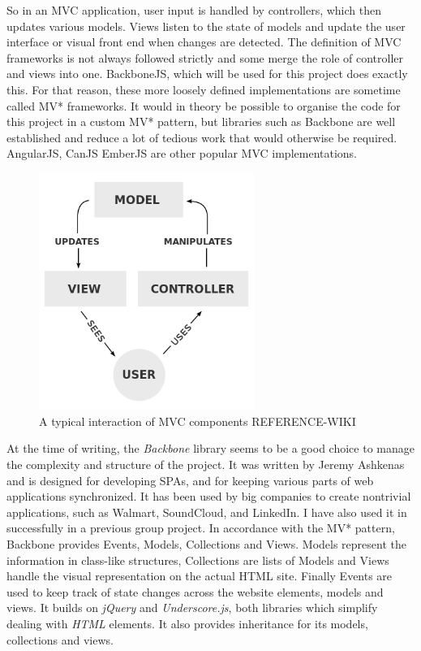\documentclass[a4paper,11pt,twoside]{article}
\begin{document}
So in an MVC application, user input is handled by controllers, which then updates various models. Views listen to the state of models and update the user interface or visual front end when changes are detected. The definition of MVC frameworks is not always followed strictly and some merge the role of controller and views into one. BackboneJS, which will be used for this project does exactly this. For that reason, these more loosely defined implementations are sometime called MV* frameworks. It would in theory be possible to organise the code for this project in a custom MV* pattern, but libraries such as Backbone are well established and reduce a lot of tedious work that would otherwise be required. AngularJS, CanJS EmberJS are other popular MVC implementations.

\begin{figure}[ht!]
\centering
\includegraphics[width=70mm]{graphics/MVC_01.png}
\caption{A typical interaction of MVC components REFERENCE-WIKI}
\label{fig:UIdesign1}
\end{figure}


At the time of writing, the \textit{Backbone} library seems to be a good choice to manage the complexity and structure of the project. It was written by Jeremy Ashkenas and is designed for developing SPAs, and for keeping various parts of web applications synchronized. It has been used by big companies to create nontrivial applications, such as Walmart, SoundCloud, and LinkedIn. I have also used it in successfully in a previous group project. In accordance with the MV* pattern, Backbone provides Events, Models, Collections and Views. Models represent the information in class-like structures, Collections are lists of Models and Views handle the visual representation on the actual HTML site. Finally Events are used to keep track of state changes across the website elements, models and views. It builds on \textit{jQuery} and \textit{Underscore.js}, both libraries which simplify dealing with \textit{HTML} elements. It also provides inheritance for its models, collections and views.
\end{document}
